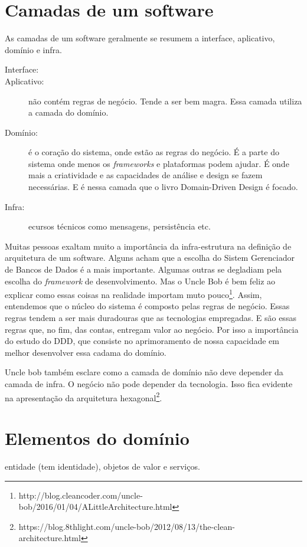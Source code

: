 \documentclass[a4paper, 12pt]{article}
\begin{document}
\section{Camadas de um software}

As camadas de um software geralmente se resumem a interface, aplicativo, domínio e infra.

\begin{description}
\item [Interface:]
\item [Aplicativo:] não contém regras de negócio. Tende a ser bem magra. Essa camada utiliza a camada do domínio.
\item [Domínio:] é o coração do sistema, onde estão as regras do negócio. É a parte do sistema onde menos os \emph{frameworks} e plataformas podem ajudar. É onde mais a criatividade e as capacidades de análise e design se fazem necessárias. E é nessa camada que o livro Domain-Driven Design é focado.
\item [Infra:] ecursos técnicos como mensagens, persistência etc.
\end{description}

Muitas pessoas exaltam muito a importância da infra-estrutura na definição de arquitetura de um software. Alguns acham que a escolha do Sistem Gerenciador de Bancos de Dados é a mais importante. Algumas outras se degladiam pela escolha do \emph{framework} de desenvolvimento. Mas o Uncle Bob é bem feliz ao explicar como essas coisas na realidade importam muto pouco\footnote{http://blog.cleancoder.com/uncle-bob/2016/01/04/ALittleArchitecture.html}. Assim, entendemos que o núcleo do sistema é composto pelas regras de negócio. Essas regras tendem a ser mais duradouras que as tecnologias empregadas. E são essas regras que, no fim, das contas, entregam valor ao negócio. Por isso a importância do estudo do DDD, que consiste no aprimoramento de nossa capacidade em melhor desenvolver essa cadama do domínio.

Uncle bob também esclare como a camada de domínio não deve depender da camada de infra. O negócio não pode depender da tecnologia. Isso fica evidente na apresentação da arquitetura hexagonal\footnote{https://blog.8thlight.com/uncle-bob/2012/08/13/the-clean-architecture.html}.

\section{Elementos do domínio}

entidade (tem identidade), objetos de valor e serviços.
\end{document}
